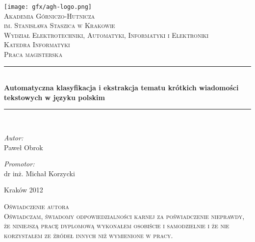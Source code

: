 \documentclass[11pt,a4paper]{article}
\newcommand{\HRule}{\rule{\linewidth}{0.5mm}}
\begin{document}
\begin{titlepage}

\begin{center}
\texttt{[image: gfx/agh-logo.png]}\\[1cm]

\textsc{\LARGE Akademia Górniczo-Hutnicza\\im. Stanisława Staszica w Krakowie}\\[0.5cm]
\textsc{\Large Wydział Elektrotechniki, Automatyki, Informatyki i Elektroniki}\\[0.5cm]
\textsc{\Large Katedra Informatyki}\\[1.5cm]
\textsc{\Large Praca magisterska}\\[0.5cm]

\HRule \\[0.4cm]
{ \Large \bfseries Automatyczna klasyfikacja i ekstrakcja tematu krótkich wiadomości tekstowych w języku polskim}\\[0.4cm]

\HRule \\[1.5cm]
\begin{minipage}{0.4\textwidth}
\begin{flushleft} \large
\emph{Autor:}\\
Paweł Obrok
\end{flushleft}
\end{minipage}
\begin{minipage}{0.4\textwidth}
\begin{flushright} \large
\emph{Promotor:} \\
dr inż. Michał Korzycki
\end{flushright}
\end{minipage}

\vfill

{\large Kraków 2012}

\end{center}

\end{titlepage}

\begin{center}
\vfill

\textsc{\Large Oświadczenie autora}\\[0.5cm]
\textsc{Oświadczam, świadomy odpowiedzialności karnej za poświadczenie nieprawdy, że niniejszą pracę dyplomową wykonałem osobiście i samodzielnie i że nie korzystałem ze źródeł innych niż wymienione w pracy.}\\[0.5cm]
\end{center}
\pagebreak
\end{document}
